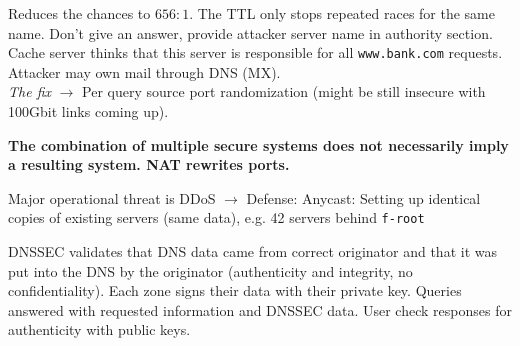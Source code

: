 Reduces the chances to $656:1$. The TTL only stops repeated races for the same name. Don't give an answer, provide attacker server name in authority section. Cache server thinks that this server is responsible for all  {\tt www.bank.com} requests. Attacker may own mail through DNS (MX). \\
\textit{The fix } $\to$ Per query source port randomization (might be still insecure with 100Gbit links coming up).

\textbf{The combination of multiple secure systems does not necessarily imply a resulting system. NAT rewrites ports.}


 Major operational threat is DDoS $\to$ Defense: Anycast: Setting up identical copies of existing servers (same data), e.g. 42 servers behind {\tt f-root}

 DNSSEC validates that DNS data came from correct originator and that it was put into the DNS by the originator (authenticity and integrity, no confidentiality). Each zone signs their data with their private key. Queries answered with requested information and DNSSEC data. User check responses for authenticity with public keys.
